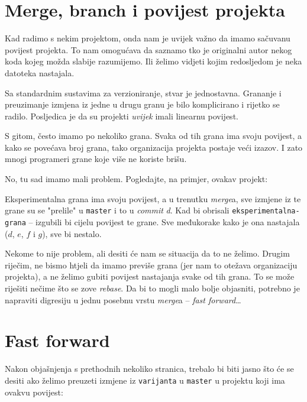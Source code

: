 
\section*{Merge, branch i povijest projekta}

Kad radimo s nekim projektom, onda nam je uvijek važno da imamo sačuvanu povijest projekta.
To nam omogućava da saznamo tko je originalni autor nekog koda kojeg možda slabije razumijemo.
Ili želimo vidjeti kojim redosljedom je neka datoteka nastajala.

Sa standardnim sustavima za verzioniranje, stvar je jednostavna. 
Grananje i preuzimanje izmjena iz jedne u drugu granu je bilo komplicirano i rijetko se radilo. 
Posljedica je da su projekti \emph{uvijek} imali linearnu povijest.



S gitom, često imamo po nekoliko grana.
Svaka od tih grana ima svoju povijest, a kako se povećava broj grana, tako organizacija projekta postaje veći izazov.
I zato mnogi programeri grane koje više ne koriste brišu.

No, tu sad imamo mali problem.
Pogledajte, na primjer, ovakav projekt:



Eksperimentalna grana ima svoju povijest, a u trenutku \emph{merge}a, sve izmjene iz te grane su se "prelile" u \verb+master+ i to u \emph{commit} \emph d.
Kad bi obrisali \verb+eksperimentalna-grana+ -- izgubili bi cijelu povijest te grane.
Sve međukorake kako je ona nastajala ($d$, $e$, $f$ i $g$), sve bi nestalo.

Nekome to nije problem, ali desiti će nam se situacija da to ne želimo.
Drugim riječim, ne bismo htjeli da imamo previše grana (jer nam to otežava organizaciju projekta), a ne želimo gubiti povijest nastajanja svake od tih grana.
To se može riješiti nečime što se zove \emph{rebase}.
Da bi to mogli malo bolje objasniti, potrebno je napraviti digresiju u jednu posebnu vrstu \emph{merge}a -- \emph{fast forward}\dots

\section*{Fast forward}

Nakon objašnjenja s prethodnih nekoliko stranica, trebalo bi biti jasno što će se desiti ako želimo preuzeti izmjene iz \verb+varijanta+ u \verb+master+ u projektu koji ima ovakvu povijest:

